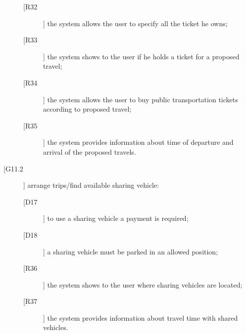 \begin{description}
\begin{description}
	\newline
	\item[[R32]] the system allows the user to specify all the ticket he owns;
	\item[[R33]] the system shows to the user if he holds a ticket for a proposed travel;
	\item[[R34]] the system allows the user to buy public transportation tickets according to proposed travel;
	\item[[R35]] the system provides information about time of departure and arrival of the proposed travels.
	\end{description}
\item[[G11.2]] arrange trips/find available sharing vehicle:
	\begin{description}
	\item[[D17]] to use a sharing vehicle a payment is required;
	\item[[D18]] a sharing vehicle must be parked in an allowed position;
	\newline
	\item[[R36]] the system shows to the user where sharing vehicles are located;
	\item[[R37]] the system provides information about travel time with shared vehicles.
	\end{description}
\end{description}